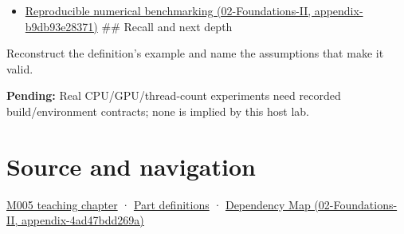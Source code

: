 \begin{itemize}
\tightlist
\item
  \href{../02-Foundations-II/main.pdf\#nameddest=appendix-b9db93e28371}{Reproducible numerical benchmarking (02-Foundations-II, appendix-b9db93e28371)} \#\# Recall and next depth
\end{itemize}

Reconstruct the definition's example and name the assumptions that make it valid.

\textbf{Pending:} Real CPU/GPU/thread-count experiments need recorded build/environment contracts; none is implied by this host lab.

\section{Source and navigation}\label{appendix-5f1a2c3f97ff-source-and-navigation}

\href{Continuous\%20Notes/Computing\%20Foundations\%20-\%20From\%20Bits\%20to\%20C++\%20and\%20Systems\%20APIs\#When\%20arithmetic\%20meets\%20uncertainty}{M005 teaching chapter} · \hyperref[appendix-fd090d982a15-m005---parts-77-88]{Part definitions} · \href{../02-Foundations-II/main.pdf\#nameddest=appendix-4ad47bdd269a}{Dependency Map (02-Foundations-II, appendix-4ad47bdd269a)}
